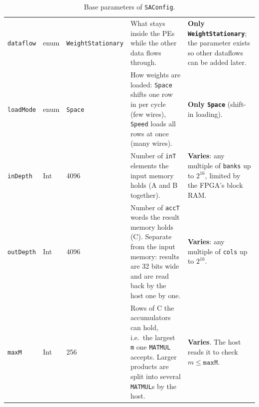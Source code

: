 \documentclass{article}
\begin{document}
\begin{table}[htbp]
\begin{tabularx}{\linewidth}{@{} l l l Y Y @{}}
  \texttt{dataflow} & enum    & \texttt{WeightStationary} & What stays inside the PEs while the other data flows through.
                    & \textbf{Only \texttt{WeightStationary}}; the parameter exists so other dataflows can be added later. \\
  \texttt{loadMode} & enum    & \texttt{Space} & How weights are loaded: \texttt{Space} shifts one row in per cycle (few wires), \texttt{Speed} loads all rows at once (many wires).
                    & \textbf{Only \texttt{Space}} (shift-in loading). \\
  \texttt{inDepth}  & Int     & 4096 & Number of \texttt{inT} elements the input memory holds (A and B together).
                    & \textbf{Varies}: any multiple of \texttt{banks} up to $2^{16}$, limited by the FPGA's block RAM. \\
 \texttt{outDepth} & Int & 4096 & Number of \texttt{accT} words the result memory holds (C). Separate from the
                                   input memory: results are 32 bits wide and are read back by the host one by one.
                    & \textbf{Varies}: any multiple of \texttt{cols} up to $2^{16}$. \\
  \texttt{maxM}     & Int     & 256  & Rows of C the accumulators can hold, i.e.\ the largest \texttt{m} one \texttt{MATMUL} accepts. Larger products are split into several \texttt{MATMUL}s by the host.
                    & \textbf{Varies}. The host reads it to check $m \le \texttt{maxM}$. \\
  \bottomrule
\end{tabularx}
\caption{Base parameters of \texttt{SAConfig}.}
\label{tab:base}
\end{table}
\end{document}
